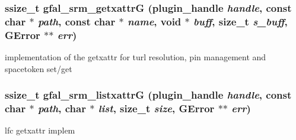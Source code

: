 \subsubsection{\setlength{\rightskip}{0pt plus 5cm}ssize\_\-t gfal\_\-srm\_\-getxattr\-G (plugin\_\-handle {\em handle}, const char $\ast$ {\em path}, const char $\ast$ {\em name}, void $\ast$ {\em buff}, size\_\-t {\em s\_\-buff}, GError $\ast$$\ast$ {\em err})}\label{gfal__common__srm__getxattr_8h_965d1353923dbcca04d0feb99449bb47}


implementation of the getxattr for turl resolution, pin management and spacetoken set/get 
\subsubsection{\setlength{\rightskip}{0pt plus 5cm}ssize\_\-t gfal\_\-srm\_\-listxattr\-G (plugin\_\-handle {\em handle}, const char $\ast$ {\em path}, char $\ast$ {\em list}, size\_\-t {\em size}, GError $\ast$$\ast$ {\em err})}\label{gfal__common__srm__getxattr_8h_522aab74f06436ef8ac83dc1dc1fc9e1}


lfc getxattr implem 